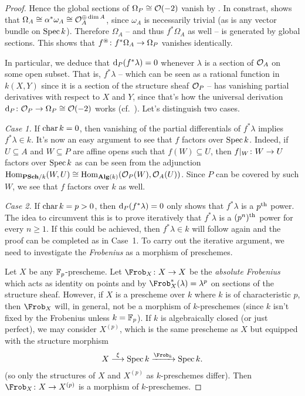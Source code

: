 \documentclass[a4paper,parskip=half,numbers=enddot, DIV=12]{scrreprt}
\renewcommand{\geq}{\geqslant}
\begin{document}
\begin{proof}
	Hence the global sections of $\Omega_P\cong \mathcal{O}(-2)$ vanish by \cite[Theorem~2]{alggeo2}. In constrast,  shows that $\Omega_A\cong\alpha^*\omega_A\cong \mathcal{O}_A^{\oplus\dim A}$, since $\omega_A$ is necessarily trivial (as is any vector bundle on $\operatorname{Spec} k$). Therefore $\Omega_A$ -- and thus $f^*\Omega_A$ as well -- is generated by global sections. This shows that $f^\oast\colon f^*\Omega_A\morphism \Omega_P$ vanishes identically.
	
	In particular, we deduce that $\mathop{}\!\mathrm{d}_P(f^*\lambda)=0$ whenever $\lambda$ is a section of $\mathcal{O}_A$ on some open subset. That is, $f^*\lambda$ -- which can be seen as a rational function in $k(X,Y)$ since it is a section of the structure sheaf $\mathcal{O}_P$ -- has vanishing partial derivatives with respect to $X$ and $Y$, since that's how the universal derivation $\d_P\colon \Oo_P\morphism\Omega_P\cong \Oo(-2)$ works (cf.\ \cite[85]{alggeo2}). Let's distinguish two cases.
	
	\emph{Case 1.} If $\operatorname{char} k=0$, then vanishing of the partial differentials of $f^*\lambda$ implies $f^*\lambda\in k$. It's now an easy argument to see that $f$ factors over $\operatorname{Spec} k$. Indeed, if $U\subseteq A$ and $W\subseteq P$ are affine opens such that $f(W)\subseteq U$, then $f|_W\colon W\morphism U$ factors over $\operatorname{Spec} k$ as can be seen from the adjunction $\Hom_{\cat{PSch}/k}(W,U)\cong \Hom_{\cat{Alg}(k)}(\Oo_P(W),\Oo_A(U))$. Since $P$ can be covered by such $W$, we see that $f$ factors over $k$ as well.
	
	\emph{Case 2.} If $\operatorname{char} k=p>0$, then $\mathop{}\!\mathrm{d}_P(f^*\lambda)=0$ only shows that $f^*\lambda$ is a $p^{\text{th}}$ power. The idea to circumvent this is to prove iteratively that $f^*\lambda$ is a $(p^n)^{\text{th}}$ power for every $n\geq 1$. If this could be achieved, then $f^*\lambda\in k$ will follow again and the proof can be completed as in Case~1. To carry out the iterative argument, we need to investigate the \emph{Frobenius} as a morphism of preschemes.
	
	Let $X$ be any $\mathbb{F}_p$-prescheme. Let $\Frob_X\colon X\morphism X$ be the \emph{absolute Frobenius} which acts as identity on points and by $\Frob_X^*(\lambda)=\lambda^p$ on sections of the structure sheaf. However, if $X$ is a prescheme over $k$ where $k$ is of characteristic $p$, then $\Frob_X$ will, in general, not be a morphism of $k$-preschemes (since $k$ isn't fixed by the Frobenius unless $k=\mathbb{F}_p$). If $k$ is algebraically closed (or just perfect), we may consider $X^{(p)}$, which is the same prescheme as $X$ but equipped with the structure morphism
	\begin{align*}
		X\morphism[\xi]\Spec k\xrightarrow{\Frob_k}\Spec k.
	\end{align*}
	(so only the structures of $X$ and $X^{(p)}$ as $k$-preschemes differ). Then $\Frob_X\colon X\morphism X^{(p)}$ is a  morphism of $k$-preschemes.
	

\end{proof}
\end{document}
